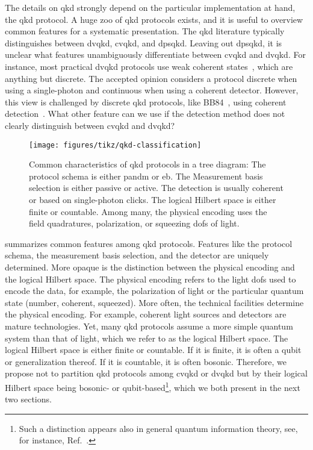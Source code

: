 The details on \gls{qkd} strongly depend on the particular implementation at hand, the \gls{qkd} protocol.
A huge zoo of \gls{qkd} protocols exists, and it is useful to overview common features for a systematic presentation.
The \gls{qkd} literature typically distinguishes between \gls{dvqkd}, \gls{cvqkd}, and \gls{dpsqkd}.
Leaving out \gls{dpsqkd}, it is unclear what features unambiguously differentiate between \gls{cvqkd} and \gls{dvqkd}.
For instance, most practical \gls{dvqkd} protocols use weak coherent states~\cite{Duvsek2006}, which are anything but discrete.
The accepted opinion considers a protocol discrete when using a single-photon and continuous when using a coherent detector.
However, this view is challenged by discrete \gls{qkd} protocols, like BB84~\cite{Bennett1984}, using coherent detection~\cite{Qi2021}.
What other feature can we use if the detection method does not clearly distinguish between \gls{cvqkd} and \gls{dvqkd}?
\begin{figure}[htb]
	\centering
	\texttt{[image: figures/tikz/qkd-classification]}
	\caption{Common characteristics of \gls{qkd} protocols in a tree diagram: The protocol schema is either \gls{pandm} or \gls{eb}. The Measurement basis selection is either passive or active. The detection is usually coherent or based on single-photon clicks. The logical Hilbert space is either finite or countable. Among many, the physical encoding uses the field quadratures, polarization, or squeezing \gls{dof}s of light.}\label{fig:qkd_classification}
\end{figure}
 summarizes common features among \gls{qkd} protocols.
Features like the protocol schema, the measurement basis selection, and the detector are uniquely determined.
More opaque is the distinction between the physical encoding and the logical Hilbert space.
The physical encoding refers to the light \gls{dof}s used to encode the data, for example, the polarization of light or the particular quantum state (number, coherent, squeezed).
More often, the technical facilities determine the physical encoding.
For example, coherent light sources and detectors are mature technologies.
Yet, many \gls{qkd} protocols assume a more simple quantum system than that of light, which we refer to as the logical Hilbert space.
The logical Hilbert space is either finite or countable.
If it is finite, it is often a qubit or generalization thereof.
If it is countable, it is often bosonic.
Therefore, we propose not to partition \gls{qkd} protocols among \gls{cvqkd} or \gls{dvqkd} but by their logical Hilbert space being bosonic- or qubit-based\footnote{Such a distinction appears also in general quantum information theory, see, for instance, Ref.~\cite[p.~2]{Weedbrook2012}.}, which we both present in the next two sections.